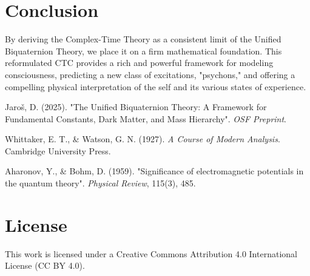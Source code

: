 \documentclass[12pt, a4paper]{article}
\begin{document}
\section{Conclusion}
By deriving the Complex-Time Theory as a consistent limit of the Unified Biquaternion Theory, we place it on a firm mathematical foundation. This reformulated CTC provides a rich and powerful framework for modeling consciousness, predicting a new class of excitations, "psychons," and offering a compelling physical interpretation of the self and its various states of experience.

\begin{thebibliography}{9}

Jaroš, D. (2025). "The Unified Biquaternion Theory: A Framework for Fundamental Constants, Dark Matter, and Mass Hierarchy". \textit{OSF Preprint}.

Whittaker, E. T., & Watson, G. N. (1927). \textit{A Course of Modern Analysis}. Cambridge University Press.

Aharonov, Y., & Bohm, D. (1959). "Significance of electromagnetic potentials in the quantum theory". \textit{Physical Review}, 115(3), 485.

\end{thebibliography}

\section*{License}
This work is licensed under a Creative Commons Attribution 4.0 International License (CC BY 4.0).
\end{document}
